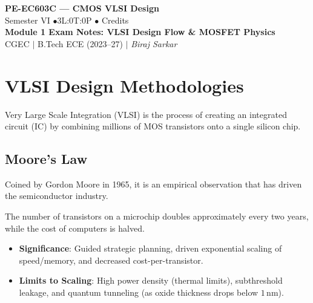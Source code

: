 \documentclass[12pt,a4paper]{article}
\begin{document}

\begin{center}
  {\LARGE\bfseries\color{myred} PE-EC603C --- CMOS VLSI Design}\\[5pt]
  {\normalsize\color{mydark} Semester VI \quad$\bullet$\quad 3L:0T:0P \quad$\bullet$ Credits}\\[3pt]
  {\normalsize\color{myteal}\textbf{Module 1 Exam Notes: VLSI Design Flow \& MOSFET Physics}}\\[3pt]
  {\small\color{mydark} CGEC \;$|$\; B.Tech ECE (2023--27) \;$|$\; \textit{Biraj Sarkar}}
\end{center}
\vspace{2pt}
\noindent{\color{myred}\rule{\linewidth}{1.5pt}}
\vspace{2pt}

\hypersetup{linkcolor=mydark}
\tableofcontents
\hypersetup{linkcolor=myteal}
\newpage

\section{VLSI Design Methodologies}

Very Large Scale Integration (VLSI) is the process of creating an integrated circuit (IC) by combining millions of MOS transistors onto a single silicon chip.

\subsection{Moore's Law}
Coined by Gordon Moore in 1965, it is an empirical observation that has driven the semiconductor industry.

\begin{tcolorbox}[defbox, title={\textbf{Moore's Law Statement}}]
The number of transistors on a microchip doubles approximately every two years, while the cost of computers is halved.
\end{tcolorbox}
\begin{itemize}[leftmargin=*, itemsep=3.5pt]
  \item \textbf{Significance}: Guided strategic planning, driven exponential scaling of speed/memory, and decreased cost-per-transistor.
  \item \textbf{Limits to Scaling}: High power density (thermal limits), subthreshold leakage, and quantum tunneling (as oxide thickness drops below $1\,\text{nm}$).
\end{itemize}
\end{document}
